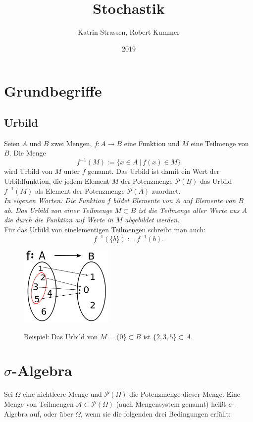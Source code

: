 \documentclass[paper=a4,10pt]{scrartcl}
\title{Stochastik}
\author{Katrin Strassen, Robert Kummer}
\date{2019}
\begin{document}
\maketitle
\newpage
\tableofcontents
\newpage
{}
\setcounter{page}{1}
\section{Grundbegriffe}
\subsection{Urbild}
Seien $A$ und $B$ zwei Mengen, $f: A \rightarrow B$ eine Funktion und $M$ eine Teilmenge von $B$. Die Menge
\begin{equation}
f^{-1}(M) := \{ x \in A \ | \ f(x) \in M \}
\end{equation}
wird Urbild von $M$ unter $f$ genannt. Das Urbild ist damit ein Wert der Urbildfunktion, die jedem Element $M$ der Potenzmenge $\mathcal{P}(B)$ das Urbild $f^{-1}(M)$ als Element der Potenzmenge $\mathcal{P}(A)$ zuordnet.\\

\noindent
\textit{In eigenen Worten: Die Funktion $f$ bildet Elemente von $A$ auf Elemente von $B$ ab. Das Urbild von einer Teilmenge $M \subset B$ ist die Teilmenge aller Werte aus $A$ die durch die Funktion auf Werte in $M$ abgebildet werden.}\\

\noindent
Für das Urbild von einelementigen Teilmengen schreibt man auch:
\begin{equation}
f^{-1}(\{b\}) := f^{-1}(b).
\end{equation}

\begin{figure}[h]
\centering
\includegraphics[width=0.4\textwidth]{../Bilder/urbild.png}
\label{urbild}
\caption{Beispiel: Das Urbild von $M=\{0\} \subset B$ ist $\{2,3,5\} \subset A$.}
\end{figure}

\section{$\sigma$-Algebra}
Sei $\Omega$ eine nichtleere Menge und $\mathcal{P}(\Omega)$ die Potenzmenge dieser Menge. Eine Menge von Teilmengen $\mathcal{A} \subset \mathcal{P}(\Omega)$ (auch Mengensystem genannt) heißt $\sigma$-Algebra auf, oder über $\Omega$, wenn sie die folgenden drei Bedingungen erfüllt:
\end{document}
